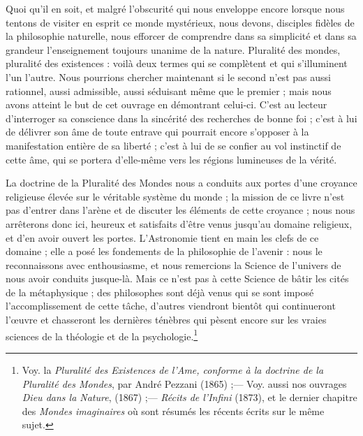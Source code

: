 \documentclass[a4paper, 11pt, oneside, landscape]{article}
\begin{document}
Quoi qu'il en soit, et malgré l'obscurité qui nous enveloppe encore lorsque nous tentons de visiter en esprit ce monde mystérieux, nous devons, disciples fidèles de la philosophie naturelle, nous efforcer de comprendre dans sa simplicité et dans sa grandeur l'enseignement toujours unanime de la nature. Pluralité des mondes, pluralité des existences : voilà deux termes qui se complètent et qui s'illuminent l'un l'autre. Nous pourrions chercher maintenant si le second n'est pas aussi rationnel, aussi admissible, aussi séduisant même que le premier ; mais nous avons atteint le but de cet ouvrage en démontrant celui-ci. C'est au lecteur d'interroger sa conscience dans la sincérité des recherches de bonne foi ; c'est à lui de délivrer son âme de toute entrave qui pourrait encore s'opposer à la manifestation entière de sa liberté ; c'est à lui de se confier au vol instinctif de cette âme, qui se portera d'elle-même vers les régions lumineuses de la vérité.

La doctrine de la Pluralité des Mondes nous a conduits aux portes d'une croyance religieuse élevée sur le véritable système du monde ; la mission de ce livre n'est pas d'entrer dans l'arène et de discuter les éléments de cette croyance ; nous nous arrêterons donc ici, heureux et satisfaits d'être venus jusqu'au domaine religieux, et d'en avoir ouvert les portes. L'Astronomie tient en main les clefs de ce domaine ; elle a posé les fondements de la philosophie de l'avenir : nous le reconnaissons avec enthousiasme, et nous remercions la Science de l'univers de nous avoir conduits jusque-là. Mais ce n'est pas à cette Science de bâtir les cités de la métaphysique ; des philosophes sont déjà venus qui se sont imposé l'accomplissement de cette tâche, d'autres viendront bientôt qui continueront l'œuvre et chasseront les dernières ténèbres qui pèsent encore sur les vraies sciences de la théologie et de la psychologie.\footnote{Voy. la \emph{Pluralité des Existences de l'Ame, conforme à la doctrine de la Pluralité des Mondes}, par André Pezzani (1865) ;--- Voy. aussi nos ouvrages \emph{Dieu dans la Nature}, (1867) ;--- \emph{Récits de l'Infini} (1873), et le dernier chapitre des \emph{Mondes imaginaires} où sont résumés les récents écrits sur le même sujet.}
\end{document}
